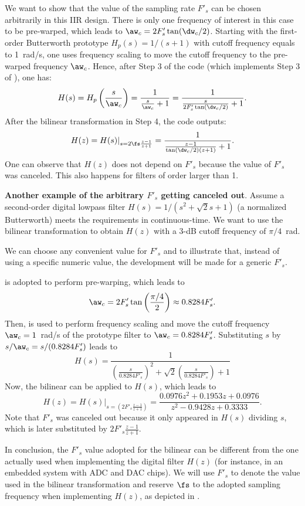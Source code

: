 We want to show that the value of the sampling rate $F'_s$ can be chosen arbitrarily in this IIR design. There is only one frequency of interest in this case to be pre-warped, which leads to $\aw_c=2 F'_s \tan(\dw_c/2)$.
Starting with the first-order Butterworth prototype $H_p(s)=1/(s+1)$ with cutoff frequency equals to 1~rad/s,
one uses frequency scaling to move the cutoff frequency to the pre-warped frequency $\aw_c$. Hence, after Step 3 of the code (which implements Step 3 of ), one has:
\[
H(s) = H_p \left( \frac{s}{\aw_c} \right) = \frac{1}{\frac{s}{\aw_c}+1}= \frac{1}{\frac{s}{2 F'_s \tan(\dw_c / 2) }+1}.
\]
After the bilinear transformation in Step 4, the code outputs:
\[
H(z) = H(s)|_{s=2\fs \frac{z-1}{z+1}} =  \frac{1}{\frac{z-1}{\tan(\dw_c / 2)(z+1) }+1}.
\]
One can observe that $H(z)$ does not depend on $F'_s$ because the value of $F'_s$ was canceled. This also
happens for filters of order larger than 1.

\bExample \textbf{Another example of the arbitrary $F'_s$ getting canceled out}.
\label{ex:fs_canceled_out}
Assume a second-order digital lowpass filter $H(s)=1/(s^2 + \sqrt{2}s + 1)$ (a normalized Butterworth) meets 
the requirements in continuous-time. We want to use the bilinear transformation to obtain $H(z)$ with a 3-dB cutoff frequency
of $\pi/4$~rad.

We can choose any convenient value for $F'_s$ and to illustrate that,
instead of using a specific numeric value, the development
will be made for a generic $F'_s$. 

 is adopted to perform pre-warping, which leads to
\[
\aw_c =  2 F'_s \tan \left( \frac{\pi/4}{2} \right) \approx 0.8284 F'_s.
\]
Then,  is used to perform frequency scaling and move the cutoff frequency $\aw_c=1$~rad/s of
the prototype filter to $\aw_c = 0.8284 F'_s$. Substituting $s$ by $s/\aw_c = s /(0.8284 F'_s)$
leads to
\[
H(s) = \frac{1}{\left( \frac{s }{0.8284 F'_s} \right)^2 + \sqrt{2} \left( \frac{s }{0.8284 F'_s} \right) + 1}
\]
Now, the bilinear can be applied to $H(s)$, which leads to
\[
H(z) = H(s)|_{s=\left(2 F'_s \frac{z-1}{z+1} \right)} = \frac{0.0976 z^2 +0.1953 z +0.0976}{z^2 - 0.9428 z + 0.3333}.
\]
Note that $F'_s$ was canceled out because it only appeared in $H(s)$ dividing $s$, which is
later substituted by $2 F'_s \frac{z-1}{z+1}$.
\eExample

In conclusion, the $F'_s$ value adopted for the bilinear can be different from the one actually used when implementing the digital filter $H(z)$ (for instance, in an embedded system with ADC and DAC chips). We will use $F'_s$ to denote the value used in the bilinear transformation and reserve $\fs$ to the adopted sampling frequency when implementing $H(z)$, as depicted in .

